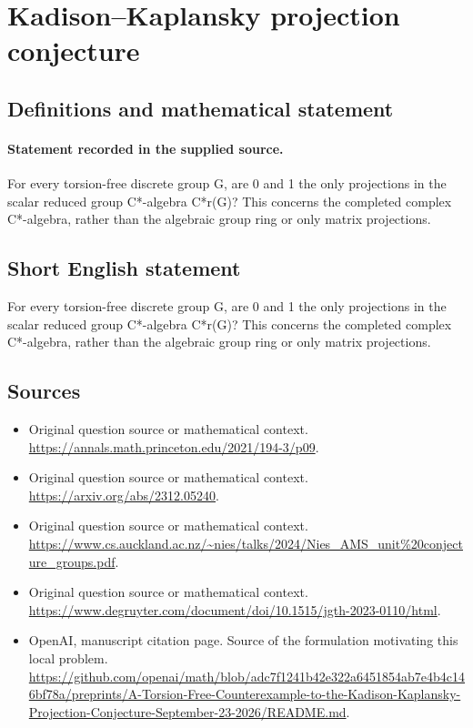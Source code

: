 \documentclass[11pt]{article}
\begin{document}
\section*{Kadison–Kaplansky projection conjecture}\label{statement}
\subsection{Definitions and mathematical statement}
\paragraph{Statement recorded in the supplied source.}
For every torsion-free discrete group G, are 0 and 1 the only projections in the scalar reduced group C*-algebra C*r(G)? This concerns the completed complex C*-algebra, rather than the algebraic group ring or only matrix projections.
\subsection{Short English statement}
For every torsion-free discrete group G, are 0 and 1 the only projections in the scalar reduced group C*-algebra C*r(G)? This concerns the completed complex C*-algebra, rather than the algebraic group ring or only matrix projections.
\subsection{Sources}
\begin{itemize}
\item[S1] Original question source or mathematical context.
\url{https://annals.math.princeton.edu/2021/194-3/p09}.
\item[S2] Original question source or mathematical context.
\url{https://arxiv.org/abs/2312.05240}.
\item[S3] Original question source or mathematical context.
\url{https://www.cs.auckland.ac.nz/~nies/talks/2024/Nies_AMS_unit%20conjecture_groups.pdf}.
\item[S4] Original question source or mathematical context.
\url{https://www.degruyter.com/document/doi/10.1515/jgth-2023-0110/html}.
\item[S5] OpenAI, manuscript citation page. Source of the formulation motivating this local problem.
\url{https://github.com/openai/math/blob/adc7f1241b42e322a6451854ab7e4b4c146bf78a/preprints/A-Torsion-Free-Counterexample-to-the-Kadison-Kaplansky-Projection-Conjecture-September-23-2026/README.md}.
\end{itemize}
\end{document}
